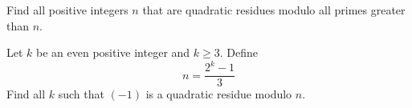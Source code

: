 \begin{problem}
	Find all positive integers $n$ that are quadratic residues modulo all primes greater than $n$.
\end{problem}


\begin{problem}
	Let $k$ be an even positive integer and $k\ge 3$. Define $$n=\frac{2^k-1}{3}$$ Find all $k$ such that $(-1)$ is a quadratic residue modulo $n$.
\end{problem}


